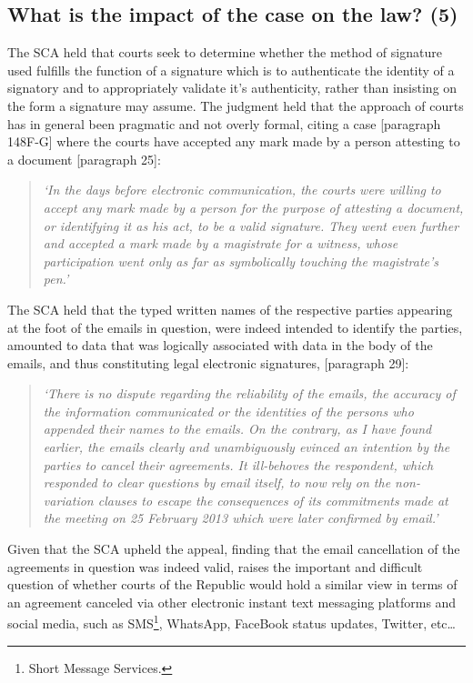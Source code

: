 \documentclass[11pt]{article}
\begin{document}
\subsection{What is the impact of the case on the law? (5)}
\label{sec:org2e71b75}

The SCA held that courts seek to determine whether the method of signature used
fulfills the function of a signature which is to authenticate the identity of a
signatory and to appropriately validate it's authenticity, rather than insisting
on the form a signature may assume. The judgment held that the approach of
courts has in general been pragmatic and not overly formal, citing a case
[paragraph 148F-G]\cite{elec_signa63_putter_v_provincial_insurance} where
the courts have accepted any mark made by a person attesting to a document
[paragraph 25]\cite{Cachalia15_spring_forest_v_wilberry}:
\begin{quote}
\textit{`In the days before electronic communication, the courts were willing to accept any mark made by a person for the purpose of attesting a document, or identifying it as his act, to be a valid signature. They went even further and accepted a mark made by a magistrate for a witness, whose participation went only as far as symbolically touching the magistrate’s pen.'}
\end{quote}

The SCA held that the typed written names of the respective parties appearing at
the foot of the emails in question, were indeed intended to identify the
parties, amounted to data that was logically associated with data in the body of
the emails, and thus constituting legal electronic signatures, [paragraph 29]\cite{Cachalia15_spring_forest_v_wilberry}:
\begin{quote}
\textit{`There is no dispute regarding the reliability of the emails, the accuracy of the information communicated or the identities of the persons who appended their names to the emails. On the contrary, as I have found earlier, the emails clearly and unambiguously evinced an intention by the parties to cancel their agreements. It ill-behoves the respondent, which responded to clear questions by email itself, to now rely on the non-variation clauses to escape the consequences of its commitments made at the meeting on 25 February 2013 which were later confirmed by email.'}
\end{quote}

Given that the SCA upheld the appeal, finding that the email cancellation of the
agreements in question was indeed valid, raises the important and difficult
question of whether courts of the Republic would hold a similar view in terms of
an agreement canceled via other electronic instant text messaging platforms and
social media, such as SMS\footnote{Short Message Services.}, WhatsApp, FaceBook
status updates, Twitter, etc\ldots{}
\end{document}
